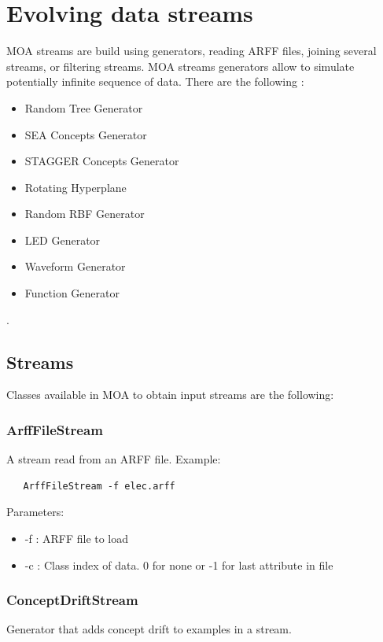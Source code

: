 \documentclass[a4paper,12pt,twoside]{book}
\begin{document}
\chapter{Evolving data streams}

MOA streams are build using generators, reading ARFF files, joining several streams, or filtering streams.
MOA streams generators allow to simulate potentially infinite sequence of data. 
There are the following :
\begin{itemize}
\item Random Tree Generator
\item SEA Concepts Generator
\item STAGGER Concepts Generator
\item Rotating Hyperplane
\item Random RBF Generator
\item LED Generator
\item Waveform Generator
\item Function Generator
\end{itemize}
.

\section{Streams}

Classes available in MOA to obtain input streams are the following:

\subsection{ArffFileStream}
 A stream read from an ARFF file.
 Example:
\begin{footnotesize}
\begin{verbatim}               
   ArffFileStream -f elec.arff
\end{verbatim} \end{footnotesize}

Parameters:

\begin{itemize}
\item 
-f : ARFF file to load
\item -c : Class index of data. 0 for none or -1 for last attribute in file\end{itemize}


\subsection{ConceptDriftStream}
 Generator that adds concept drift to examples in a stream.
\end{document}
